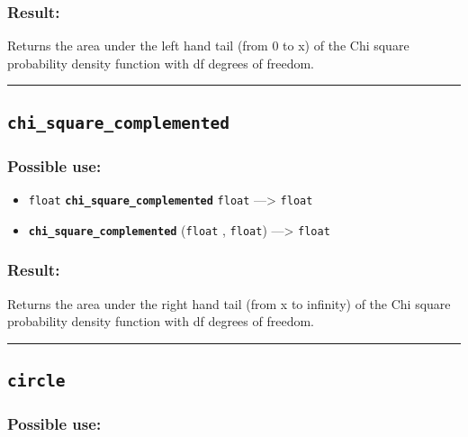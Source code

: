 \documentclass[]{book}
\providecommand{\tightlist}{%
  \setlength{\itemsep}{0pt}\setlength{\parskip}{0pt}}
\theoremstyle{definition}
\theoremstyle{definition}
\theoremstyle{definition}
\theoremstyle{remark}
\begin{document}
\subsubsection{Result:}\label{result-81}

Returns the area under the left hand tail (from 0 to x) of the Chi
square probability density function with df degrees of freedom.

\begin{center}\rule{0.5\linewidth}{\linethickness}\end{center}

\subsection{\texorpdfstring{\texttt{chi\_square\_complemented}}{chi\_square\_complemented}}\label{chi_square_complemented}

\subsubsection{Possible use:}\label{possible-use-84}

\begin{itemize}
\tightlist
\item
  \texttt{float} \textbf{\texttt{chi\_square\_complemented}}
  \texttt{float} ---\textgreater{} \texttt{float}
\item
  \textbf{\texttt{chi\_square\_complemented}} (\texttt{float} ,
  \texttt{float}) ---\textgreater{} \texttt{float}
\end{itemize}

\subsubsection{Result:}\label{result-82}

Returns the area under the right hand tail (from x to infinity) of the
Chi square probability density function with df degrees of freedom.

\begin{center}\rule{0.5\linewidth}{\linethickness}\end{center}

\subsection{\texorpdfstring{\texttt{circle}}{circle}}\label{circle}

\subsubsection{Possible use:}\label{possible-use-85}
\end{document}
